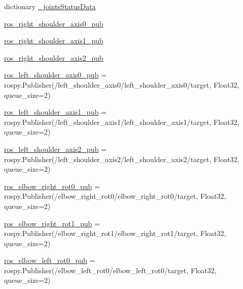 \begin{DoxyCompactItemize}
\item 
dictionary \mbox{\hyperlink{namespacesteering__simulation_a151daa71bd805d2dd04fe522c1ddac4f}{\+\_\+joints\+Status\+Data}}
\item 
\mbox{\hyperlink{namespacesteering__simulation_a7824803c03df4637e22449c926522d6d}{ros\+\_\+right\+\_\+shoulder\+\_\+axis0\+\_\+pub}}
\item 
\mbox{\hyperlink{namespacesteering__simulation_a5da8818119a4289e3ed21573706ee4ad}{ros\+\_\+right\+\_\+shoulder\+\_\+axis1\+\_\+pub}}
\item 
\mbox{\hyperlink{namespacesteering__simulation_a70a5d7e7cbdd1a4af5ac27b114633b9d}{ros\+\_\+right\+\_\+shoulder\+\_\+axis2\+\_\+pub}}
\item 
\mbox{\hyperlink{namespacesteering__simulation_a0f7519e7fbc7a8cabdcdde1482ccacde}{ros\+\_\+left\+\_\+shoulder\+\_\+axis0\+\_\+pub}} = rospy.\+Publisher(\textquotesingle{}/left\+\_\+shoulder\+\_\+axis0/left\+\_\+shoulder\+\_\+axis0/target\textquotesingle{}, Float32, queue\+\_\+size=2)
\item 
\mbox{\hyperlink{namespacesteering__simulation_a75aaf98b6863a0aee4b61ee17b0133ba}{ros\+\_\+left\+\_\+shoulder\+\_\+axis1\+\_\+pub}} = rospy.\+Publisher(\textquotesingle{}/left\+\_\+shoulder\+\_\+axis1/left\+\_\+shoulder\+\_\+axis1/target\textquotesingle{}, Float32, queue\+\_\+size=2)
\item 
\mbox{\hyperlink{namespacesteering__simulation_af594d9d0bfdf575e6e26e0b6a3a53c8b}{ros\+\_\+left\+\_\+shoulder\+\_\+axis2\+\_\+pub}} = rospy.\+Publisher(\textquotesingle{}/left\+\_\+shoulder\+\_\+axis2/left\+\_\+shoulder\+\_\+axis2/target\textquotesingle{}, Float32, queue\+\_\+size=2)
\item 
\mbox{\hyperlink{namespacesteering__simulation_a3d22b5897eee35c841b1df82b5d02111}{ros\+\_\+elbow\+\_\+right\+\_\+rot0\+\_\+pub}} = rospy.\+Publisher(\textquotesingle{}/elbow\+\_\+right\+\_\+rot0/elbow\+\_\+right\+\_\+rot0/target\textquotesingle{}, Float32, queue\+\_\+size=2)
\item 
\mbox{\hyperlink{namespacesteering__simulation_a1280b460562790964403c7752bbc056d}{ros\+\_\+elbow\+\_\+right\+\_\+rot1\+\_\+pub}} = rospy.\+Publisher(\textquotesingle{}/elbow\+\_\+right\+\_\+rot1/elbow\+\_\+right\+\_\+rot1/target\textquotesingle{}, Float32, queue\+\_\+size=2)
\item 
\mbox{\hyperlink{namespacesteering__simulation_a3e18ade3c9e741db3cd48035d7d11b43}{ros\+\_\+elbow\+\_\+left\+\_\+rot0\+\_\+pub}} = rospy.\+Publisher(\textquotesingle{}/elbow\+\_\+left\+\_\+rot0/elbow\+\_\+left\+\_\+rot0/target\textquotesingle{}, Float32, queue\+\_\+size=2)

\end{DoxyCompactItemize}
